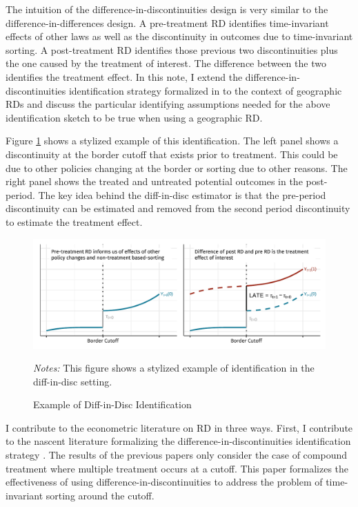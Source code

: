\documentclass[12pt]{article}
\begin{document}
The intuition of the difference-in-discontinuities design is very similar to the difference-in-differences design. A pre-treatment RD identifies time-invariant effects of other laws as well as the discontinuity in outcomes due to time-invariant sorting. A post-treatment RD identifies those previous two discontinuities plus the one caused by the treatment of interest. The difference between the two identifies the treatment effect. In this note, I extend the difference-in-discontinuities identification strategy formalized in \citet{Grembi_Nannicini_Troiano_2016} to the context of geographic RDs and discuss the particular identifying assumptions needed for the above identification sketch to be true when using a geographic RD. 

Figure \ref{fig:example} shows a stylized example of this identification. The left panel shows a discontinuity at the border cutoff that exists prior to treatment. This could be due to other policies changing at the border or sorting due to other reasons. The right panel shows the treated and untreated potential outcomes in the post-period. The key idea behind the diff-in-disc estimator is that the pre-period discontinuity can be estimated and removed from the second period discontinuity to estimate the treatment effect.

\begin{figure}[tb]
    \caption{Example of Diff-in-Disc Identification}
    \label{fig:example}

    \begin{adjustbox}{width = 1\textwidth, center}
        \includegraphics[width=\textwidth]{../../figures/diff_in_disc.pdf}
    \end{adjustbox}

    {\footnotesize \emph{Notes:} This figure shows a stylized example of identification in the diff-in-disc setting.}
\end{figure}

I contribute to the econometric literature on RD in three ways. First, I contribute to the nascent literature formalizing the difference-in-discontinuities identification strategy \citep{Grembi_Nannicini_Troiano_2016,Galindo-Silva_Some_Tchuente_2021,Millan-Quijano_2020}. The results of the previous papers only consider the case of compound treatment where multiple treatment occurs at a cutoff. This paper formalizes the effectiveness of using difference-in-discontinuities to address the problem of time-invariant sorting around the cutoff.
\end{document}
